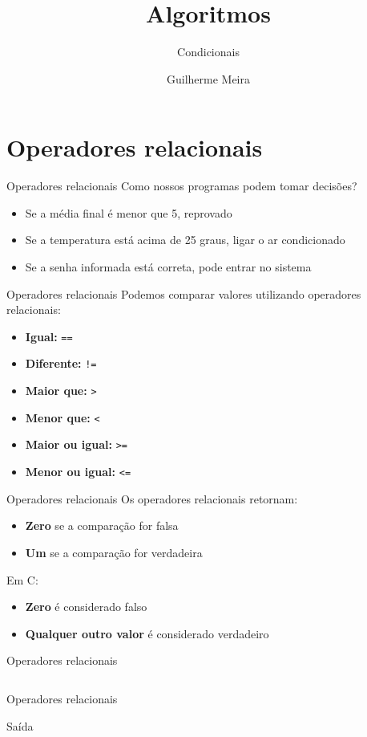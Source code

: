 \documentclass{beamer}
\title{Algoritmos} %
\subtitle{Condicionais} %
\author{Guilherme Meira}
\begin{document}
  \frame{\maketitle}
\section{Operadores relacionais}
\begin{frame}{Operadores relacionais}
	Como nossos programas podem tomar decisões?
	\begin{itemize}
		\item Se a média final é menor que 5, reprovado
		\item Se a temperatura está acima de 25 graus, ligar o ar condicionado
		\item Se a senha informada está correta, pode entrar no sistema
	\end{itemize}
\end{frame}
\begin{frame}{Operadores relacionais}
	Podemos comparar valores utilizando \alert{operadores relacionais}:
	\begin{itemize}
		\item \textbf{Igual:} \texttt{==}
		\item \textbf{Diferente:} \texttt{!=}
		\item \textbf{Maior que:} \texttt{>}
		\item \textbf{Menor que:} \texttt{<}
		\item \textbf{Maior ou igual:} \texttt{>=}
		\item \textbf{Menor ou igual:} \texttt{<=}
	\end{itemize}
\end{frame}
\begin{frame}{Operadores relacionais}
	Os operadores relacionais retornam:
	\begin{itemize}
		\item \textbf{Zero} se a comparação for falsa
		\item \textbf{Um} se a comparação for verdadeira
	\end{itemize}
	Em C:
	\begin{itemize}
		\item \textbf{Zero} é considerado \alert{falso}
		\item \textbf{Qualquer outro valor} é considerado \alert{verdadeiro}
	\end{itemize}
\end{frame}
\begin{frame}{Operadores relacionais}
	\inputminted{c}{resources/relational.c}
\end{frame}
\begin{frame}{Operadores relacionais}
	\begin{block}{Saída}
		\inputminted{text}{resources/relational.txt}
	\end{block}
\end{frame}
\end{document}
